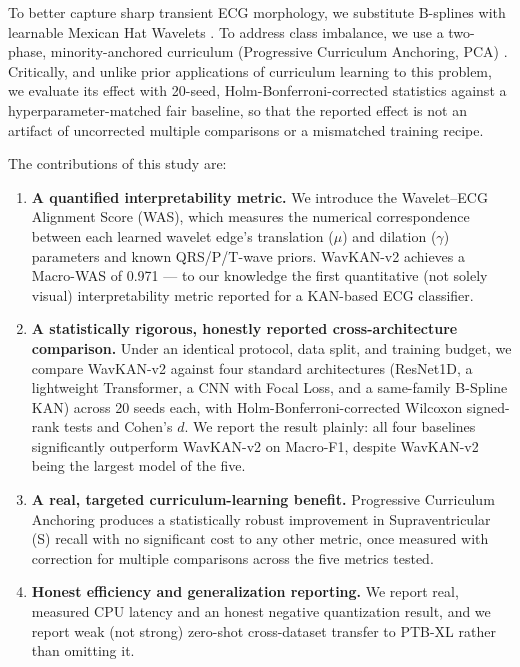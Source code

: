 \documentclass[journal,twoside,web]{ieeecolor}
\begin{document}
To better capture sharp transient ECG morphology, we substitute B-splines with learnable Mexican Hat Wavelets \cite{addison_wavelet_2005, bozorgasl_liu_2024}. To address class imbalance, we use a two-phase, minority-anchored curriculum (Progressive Curriculum Anchoring, PCA) \cite{bengio_curriculum_2009, schmale_curriculum_2025}. Critically, and unlike prior applications of curriculum learning to this problem, we evaluate its effect with 20-seed, Holm-Bonferroni-corrected statistics against a hyperparameter-matched fair baseline, so that the reported effect is not an artifact of uncorrected multiple comparisons or a mismatched training recipe.

The contributions of this study are:
\begin{enumerate}
    \item \textbf{A quantified interpretability metric.} We introduce the Wavelet--ECG Alignment Score (WAS), which measures the numerical correspondence between each learned wavelet edge's translation ($\mu$) and dilation ($\gamma$) parameters and known QRS/P/T-wave priors. WavKAN-v2 achieves a Macro-WAS of 0.971 --- to our knowledge the first quantitative (not solely visual) interpretability metric reported for a KAN-based ECG classifier.
    \item \textbf{A statistically rigorous, honestly reported cross-architecture comparison.} Under an identical protocol, data split, and training budget, we compare WavKAN-v2 against four standard architectures (ResNet1D, a lightweight Transformer, a CNN with Focal Loss, and a same-family B-Spline KAN) across 20 seeds each, with Holm-Bonferroni-corrected Wilcoxon signed-rank tests and Cohen's $d$. We report the result plainly: all four baselines significantly outperform WavKAN-v2 on Macro-F1, despite WavKAN-v2 being the largest model of the five.
    \item \textbf{A real, targeted curriculum-learning benefit.} Progressive Curriculum Anchoring produces a statistically robust improvement in Supraventricular (S) recall with no significant cost to any other metric, once measured with correction for multiple comparisons across the five metrics tested.
    \item \textbf{Honest efficiency and generalization reporting.} We report real, measured CPU latency and an honest negative quantization result, and we report weak (not strong) zero-shot cross-dataset transfer to PTB-XL rather than omitting it.
\end{enumerate}

\end{document}
